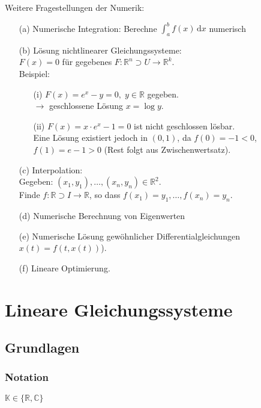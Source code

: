 \documentclass[11pt]{scrartcl}
\renewcommand{\d}{\,\mathrm d}
\newcommand*{\RR}{\mathbb R}
\theoremstyle{break}
\theoremstyle{remark}
\begin{document}
Weitere Fragestellungen der Numerik:
\begin{enumerate}
\item[(a)]
Numerische Integration: Berechne $\int_a^b f(x) \d x$ numerisch
\item[(b)]
Lösung nichtlinearer Gleichungssysteme: \\
$F(x) = 0$ für gegebenes $F\colon \RR^n \supset U \rightarrow \mathbb{R}^k$. \\
Beispiel:
\begin{enumerate}
\item[(i)]
$F(x)=e^x-y = 0,\; y \in \mathbb{R}$ gegeben. \\
$\rightarrow$ geschlossene Lösung $x = \log y.$
\item[(ii)]
$F(x)=x \cdot e^x -1 = 0$ ist nicht geschlossen lösbar. \\
Eine Lösung existiert jedoch in $(0,1)$, da $f(0) = -1 < 0$, \\
$f(1)= e-1>0 $ (Rest folgt aus Zwischenwertsatz).
\end{enumerate}
\item[(c)]
Interpolation: \\
Gegeben: $(x_1,y_1), \dots, (x_n,y_n) \in \mathbb{R}^2$. \\
Finde $f: \RR \supset I \to \RR$, so dass
$f(x_1) = y_1, \dots , f(x_n)=y_n$.
\item[(d)]
Numerische Berechnung von Eigenwerten
\item[(e)]
Numerische Lösung gewöhnlicher Differentialgleichungen $x(t)=f(t,x(t))$).
\item[(f)]
Lineare Optimierung.
\end{enumerate}

\newpage
\section{Lineare Gleichungssysteme}

\subsection{Grundlagen}

\subsubsection{Notation}

$\mathbb{K} \in \{\mathbb{R}, \mathbb{C}\}$ \\
\end{document}
